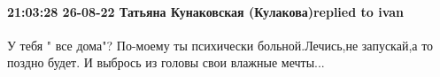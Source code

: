  
 
 
 
 

\paragraph{21:03:28 26-08-22 Татьяна Кунаковская (Кулакова)replied to ivan}

У тебя " все дома"? По-моему ты психически больной.Лечись,не запускай,а то
поздно будет. И выбрось из головы свои влажные мечты...
